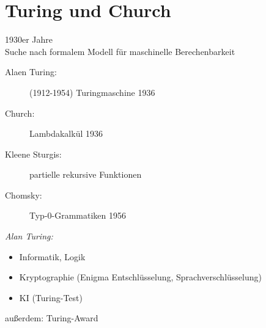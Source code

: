 \section{Turing und Church}
1930er Jahre\\
Suche nach formalem Modell für maschinelle Berechenbarkeit
\begin{description}
	\item[Alaen Turing:] (1912-1954) Turingmaschine 1936
	\item[Church:] Lambdakalkül 1936
	\item[Kleene Sturgis:] partielle rekursive Funktionen
	\item[Chomsky:] Typ-0-Grammatiken 1956
\end{description}
\emph{Alan Turing:}\begin{minipage}[t]{.8\textwidth}
\begin{itemize}[parsep=0pt]
	\item Informatik, Logik
	\item Kryptographie (Enigma Entschlüsselung, Sprachverschlüsselung)
	\item KI (Turing-Test)
\end{itemize}\end{minipage}

außerdem: Turing-Award

